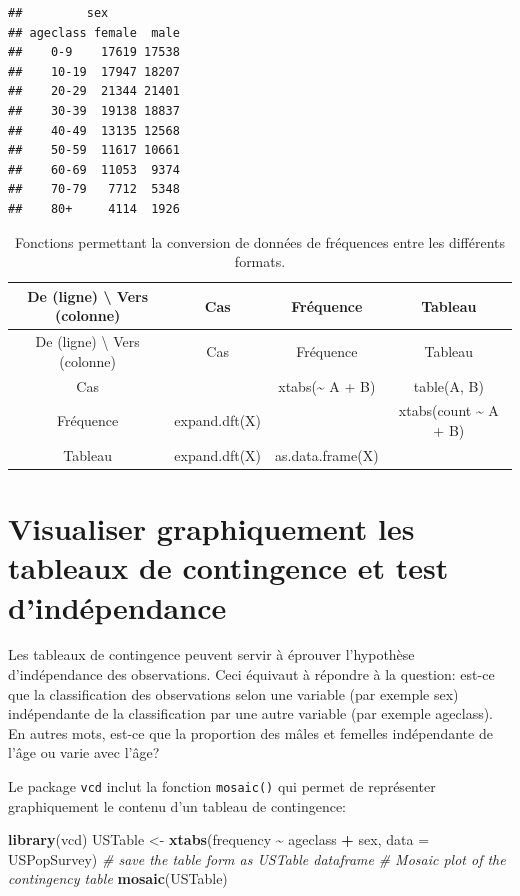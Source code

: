 \documentclass[
  12pt,
]{book}
\newenvironment{Shaded}{\begin{snugshade}}{\end{snugshade}}
\newcommand{\CommentTok}[1]{\textcolor[rgb]{0.56,0.35,0.01}{\textit{#1}}}
\newcommand{\DataTypeTok}[1]{\textcolor[rgb]{0.13,0.29,0.53}{#1}}
\newcommand{\KeywordTok}[1]{\textcolor[rgb]{0.13,0.29,0.53}{\textbf{#1}}}
\newcommand{\NormalTok}[1]{#1}
\newcommand{\OperatorTok}[1]{\textcolor[rgb]{0.81,0.36,0.00}{\textbf{#1}}}
\newcommand{\StringTok}[1]{\textcolor[rgb]{0.31,0.60,0.02}{#1}}
\begin{document}
\begin{verbatim}
##         sex
## ageclass female  male
##    0-9    17619 17538
##    10-19  17947 18207
##    20-29  21344 21401
##    30-39  19138 18837
##    40-49  13135 12568
##    50-59  11617 10661
##    60-69  11053  9374
##    70-79   7712  5348
##    80+     4114  1926
\end{verbatim}

\begin{longtable}[]{@{}cccc@{}}
\caption{\label{tab:unnamed-chunk-1}Fonctions permettant la conversion de données de fréquences entre les différents formats.}\tabularnewline
\toprule
De (ligne) \textbackslash{} Vers (colonne) & Cas & Fréquence & Tableau\tabularnewline
\midrule
\endfirsthead
\toprule
De (ligne) \textbackslash{} Vers (colonne) & Cas & Fréquence & Tableau\tabularnewline
\midrule
\endhead
Cas & & xtabs(\textasciitilde{} A + B) & table(A, B)\tabularnewline
Fréquence & expand.dft(X) & & xtabs(count \textasciitilde{} A + B)\tabularnewline
Tableau & expand.dft(X) & as.data.frame(X) &\tabularnewline
\bottomrule
\end{longtable}

\hypertarget{visualiser-graphiquement-les-tableaux-de-contingence-et-test-dinduxe9pendance}{%
\section{Visualiser graphiquement les tableaux de contingence et test d'indépendance}\label{visualiser-graphiquement-les-tableaux-de-contingence-et-test-dinduxe9pendance}}

Les tableaux de contingence peuvent servir à éprouver l'hypothèse d'indépendance des observations. Ceci équivaut à répondre à la question: est-ce que la classification des observations selon une variable (par exemple sex) indépendante de la classification par une autre variable (par exemple ageclass). En autres mots, est-ce que la proportion des mâles et femelles indépendante de l'âge ou varie avec l'âge?

Le package \texttt{vcd} inclut la fonction \texttt{mosaic()} qui permet de représenter graphiquement le contenu d'un tableau de contingence:

\begin{Shaded}
\begin{Highlighting}[]
\KeywordTok{library}\NormalTok{(vcd)}
\NormalTok{USTable \textless{}{-}}\StringTok{ }\KeywordTok{xtabs}\NormalTok{(frequency }\OperatorTok{\textasciitilde{}}\StringTok{ }\NormalTok{ageclass }\OperatorTok{+}\StringTok{ }\NormalTok{sex, }\DataTypeTok{data =}\NormalTok{ USPopSurvey) }\CommentTok{\# save the table form as USTable dataframe}
\CommentTok{\# Mosaic plot of the contingency table}
\KeywordTok{mosaic}\NormalTok{(USTable)}
\end{Highlighting}
\end{Shaded}
\end{document}
